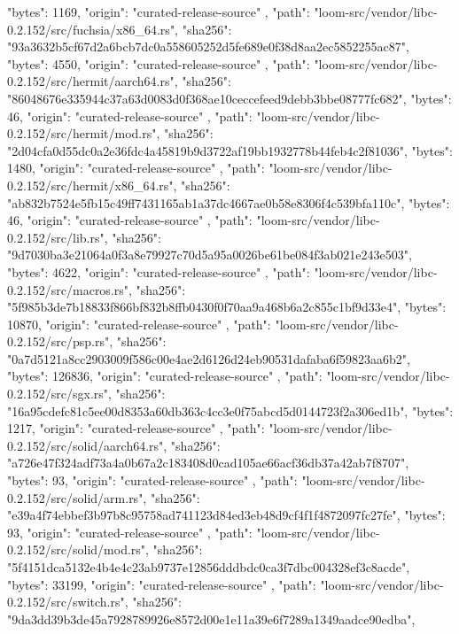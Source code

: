 {{      "bytes": 1169,
      "origin": "curated-release-source"
    },
    {
      "path": "loom-src/vendor/libc-0.2.152/src/fuchsia/x86_64.rs",
      "sha256": "93a3632b5cf67d2a6bcb7dc0a558605252d5fe689e0f38d8aa2ec5852255ac87",
      "bytes": 4550,
      "origin": "curated-release-source"
    },
    {
      "path": "loom-src/vendor/libc-0.2.152/src/hermit/aarch64.rs",
      "sha256": "86048676e335944c37a63d0083d0f368ae10ceccefeed9debb3bbe08777fc682",
      "bytes": 46,
      "origin": "curated-release-source"
    },
    {
      "path": "loom-src/vendor/libc-0.2.152/src/hermit/mod.rs",
      "sha256": "2d04cfa0d55dc0a2e36fdc4a45819b9d3722af19bb1932778b44feb4c2f81036",
      "bytes": 1480,
      "origin": "curated-release-source"
    },
    {
      "path": "loom-src/vendor/libc-0.2.152/src/hermit/x86_64.rs",
      "sha256": "ab832b7524e5fb15c49ff7431165ab1a37dc4667ae0b58e8306f4c539bfa110c",
      "bytes": 46,
      "origin": "curated-release-source"
    },
    {
      "path": "loom-src/vendor/libc-0.2.152/src/lib.rs",
      "sha256": "9d7030ba3e21064a0f3a8e79927c70d5a95a0026be61be084f3ab021e243e503",
      "bytes": 4622,
      "origin": "curated-release-source"
    },
    {
      "path": "loom-src/vendor/libc-0.2.152/src/macros.rs",
      "sha256": "5f985b3de7b18833f866bf832b8ffb0430f0f70aa9a468b6a2c855c1bf9d33e4",
      "bytes": 10870,
      "origin": "curated-release-source"
    },
    {
      "path": "loom-src/vendor/libc-0.2.152/src/psp.rs",
      "sha256": "0a7d5121a8cc2903009f586c00e4ae2d6126d24eb90531dafaba6f59823aa6b2",
      "bytes": 126836,
      "origin": "curated-release-source"
    },
    {
      "path": "loom-src/vendor/libc-0.2.152/src/sgx.rs",
      "sha256": "16a95cdefc81c5ee00d8353a60db363c4cc3e0f75abcd5d0144723f2a306ed1b",
      "bytes": 1217,
      "origin": "curated-release-source"
    },
    {
      "path": "loom-src/vendor/libc-0.2.152/src/solid/aarch64.rs",
      "sha256": "a726e47f324adf73a4a0b67a2c183408d0cad105ae66acf36db37a42ab7f8707",
      "bytes": 93,
      "origin": "curated-release-source"
    },
    {
      "path": "loom-src/vendor/libc-0.2.152/src/solid/arm.rs",
      "sha256": "e39a4f74ebbef3b97b8c95758ad741123d84ed3eb48d9cf4f1f4872097fc27fe",
      "bytes": 93,
      "origin": "curated-release-source"
    },
    {
      "path": "loom-src/vendor/libc-0.2.152/src/solid/mod.rs",
      "sha256": "5f4151dca5132e4b4e4c23ab9737e12856dddbdc0ca3f7dbc004328ef3c8acde",
      "bytes": 33199,
      "origin": "curated-release-source"
    },
    {
      "path": "loom-src/vendor/libc-0.2.152/src/switch.rs",
      "sha256": "9da3dd39b3de45a7928789926e8572d00e1e11a39e6f7289a1349aadce90edba",
}}
